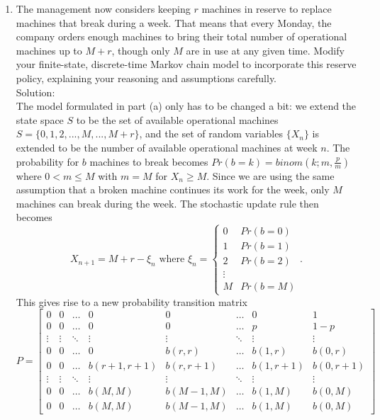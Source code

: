 \documentclass[12pt]{article}
\numberwithin{equation}{section}
\newcommand{\M}{\mathcal{M}}
\begin{document}
\begin{enumerate}
\begin{enumerate}
                \item The management now considers keeping $r$ machines in reserve to replace machines that break during a week. That means that every Monday, the company orders enough machines to bring their total number of operational machines up to $M+r$, though only $M$ are in use at any given time. Modify your finite-state, discrete-time Markov chain model to incorporate this reserve policy, explaining your reasoning and assumptions carefully.\\

                    Solution:\\

                    The model formulated in part (a) only has to be changed a bit: we extend the state space $S$ to be the set of available operational machines $S=\{0,1,2,...,M,...,M+r\}$, and the set of random variables $\{X_n\}$ is extended to be the number of available operational machines at week $n$. The probability for $b$ machines to break becomes $Pr(b=k)=binom(k;m,\frac{p}{m})$ where $0<m\leq M$ with $m=M$ for $X_n\geq M$. Since we are using the same assumption that a broken machine continues its work for the week, only $M$ machines can break during the week. The stochastic update rule then becomes
                    $$X_{n+1}=M+r-\xi_n\text{ where }\xi_n=\left\{\begin{array}{cc}0&Pr(b=0)\\1&Pr(b=1)\\2&Pr(b=2)\\\vdots\\M&Pr(b=M)\end{array}\right..$$
                    This gives rise to a new probability transition matrix
                    $$P=\left[\begin{array}{cccccccc}0&0&\dots&0&0&\dots&0&1\\
                    0&0&\dots&0&0&\dots&p&1-p\\
                    \vdots&\vdots&\ddots&\vdots&\vdots&\ddots&\vdots&\vdots\\
                    0&0&\dots&0&b(r,r)&\dots&b(1,r)&b(0,r)\\
                    0&0&\dots&b(r+1,r+1)&b(r,r+1)&\dots&b(1,r+1)&b(0,r+1)\\
                    \vdots&\vdots&\ddots&\vdots&\vdots&\ddots&\vdots&\vdots\\
                    0&0&\dots&b(M,M)&b(M-1,M)&\dots&b(1,M)&b(0,M)\\
                    0&0&\dots&b(M,M)&b(M-1,M)&\dots&b(1,M)&b(0,M)\end{array}\right]$$


\end{enumerate}
\end{enumerate}
\end{document}
